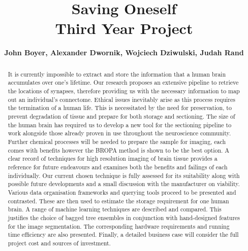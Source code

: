 \documentclass[a4paper, 11pt]{article}
\title{Saving Oneself \\ \large Third Year Project}
\author{\textbf{John Boyer, Alexander Dwornik, Wojciech Dziwulski, Judah Rand}}
\date{}
\numberwithin{equation}{section}
\begin{document}
	
	\clearpage
	\maketitle
	\thispagestyle{empty}
	\begin{abstract}
		
		It is currently impossible to extract and store the information that a human brain accumulates over one's lifetime. Our research proposes an extensive pipeline to retrieve the locations of synapses, therefore providing us with the necessary information to map out an individual's connectome. Ethical issues inevitably arise as this process requires the termination of a human life. This is necessitated by the need for preservation, to prevent degradation of tissue and prepare for both storage and sectioning. The size of the human brain has required us to develop a new tool for the sectioning pipeline to work alongside those already proven in use throughout the neuroscience community. Further chemical processes will be needed to prepare the sample for imaging, each comes with benefits however the BROPA method is shown to be the best option. A clear record of techniques for high resolution imaging of brain tissue provides a reference for future endeavours and examines both the benefits and failings of each individually. Our current chosen technique is fully assessed for its suitability along with possible future developments and a small discussion with the manufacturer on viability. Various data organisation frameworks and querying tools proceed to be presented and contrasted. These are then used to estimate the storage requirement for one human brain. A range of machine learning techniques are described and compared. This justifies the choice of bagged tree ensembles in conjunction with hand-designed features for the image segmentation. The corresponding hardware requirements and running time efficiency are also presented. Finally, a detailed business case will consider the full project cost and sources of investment.
		
	\end{abstract}
	
	\newpage
	
	\newpage
	
	\newpage
	
	\newpage
	
	
	\newpage
	\tableofcontents 
	
	
	\newpage
	
\end{document}
